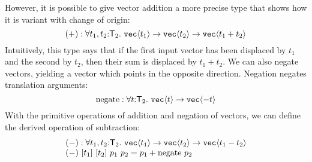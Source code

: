 However, it is possible to give vector addition a more precise type
that shows how it is variant with change of origin:
\begin{displaymath}
  (+) : \forall t_1, t_2 \mathord: \SynTransl{2}.\ \tyPrim{vec}{t_1} \to \tyPrim{vec}{t_2} \to \tyPrim{vec}{t_1 + t_2}
\end{displaymath}
Intuitively, this type says that if the first input vector has been
displaced by $t_1$ and the second by $t_2$, then their sum is
displaced by $t_1 + t_2$. We can also negate vectors, yielding a
vector which points in the opposite direction. Negation negates
translation arguments:
\begin{displaymath}
  \mathrm{negate} : \forall t \mathord: \mathsf{T}_2.\ \texttt{vec}\langle t \rangle \to \texttt{vec}\langle -t \rangle
\end{displaymath}
With the primitive operations of addition and negation of vectors, we
can define the derived operation of subtraction:
\begin{displaymath}
  \begin{array}{l}
    (-) : \forall t_1,t_2 \mathord:\mathsf{T}_2.\ \texttt{vec}\langle t_1 \rangle \to \texttt{vec}\langle t_2 \rangle \to \texttt{vec}\langle t_1 - t_2 \rangle \\
    (-)\ [t_1]\ [t_2]\ p_1\ p_2 = p_1 + \mathrm{negate}\ p_2
  \end{array}
\end{displaymath}

